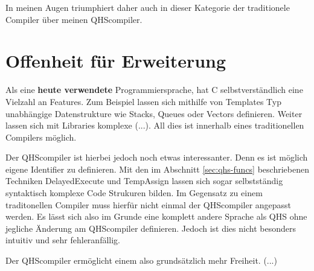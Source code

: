 In meinen Augen triumphiert daher auch in dieser Kategorie der traditionele Compiler über meinen QHScompiler.

\section{Offenheit für Erweiterung}
Als eine \textbf{heute verwendete} Programmiersprache, hat C selbstverständlich eine Vielzahl an Features. Zum Beispiel lassen sich mithilfe von Templates Typ unabhängige Datenstrukture wie Stacks, Queues oder Vectors definieren.
Weiter lassen sich mit Libraries komplexe (...). All dies ist innerhalb eines traditionellen Compilers möglich.

Der QHScompiler ist hierbei jedoch noch etwas interessanter. Denn es ist möglich eigene Identifier zu definieren. Mit den im Abschnitt \ref{sec:qhs-funcs} beschriebenen Techniken DelayedExecute und TempAssign
lassen sich sogar selbstständig syntaktisch komplexe Code Strukuren bilden. Im Gegensatz zu einem traditonellen Compiler muss hierfür nicht einmal der QHScompiler angepasst werden.
Es lässt sich also im Grunde eine komplett andere Sprache als QHS ohne jegliche Änderung am QHScompiler definieren. Jedoch ist dies nicht besonders intuitiv und sehr fehleranfällig.

Der QHScompiler ermöglicht einem also grundsätzlich mehr Freiheit. (...)